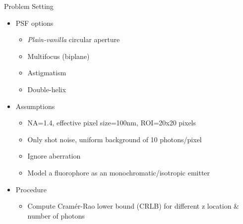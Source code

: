 \documentclass[t]{beamer}
\begin{document}
\begin{frame}{
    Problem Setting
}
    \begin{itemize}
        \item PSF options
    \begin{itemize}
        \item \textit{Plain-vanilla} circular aperture
        \item Multifocus (biplane) 
        \item Astigmatism
        \item Double-helix
    \end{itemize}
    \item Assumptions
    \begin{itemize}
 \item NA=1.4, effective pixel size=100nm, ROI=20x20 pixels
 \item Only shot noise, uniform background of 10 photons/pixel
         \item   Ignore aberration 
         \item   Model a fluorophore as an monochromatic/isotropic emitter 
    \end{itemize}
 \item Procedure
    \begin{itemize}
        \item Compute Cram\'{e}r-Rao lower bound (CRLB) for different z location \& number of photons
    \end{itemize}
    \end{itemize}
\end{frame}
\end{document}
